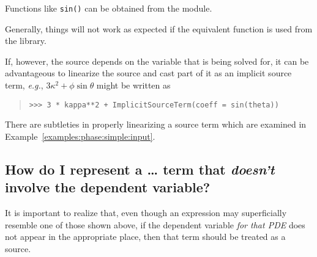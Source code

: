            \begin{reSTadmonition}[Note]
                Functions like \verb+sin()+ can be obtained from the
                 module.
                \begin{reSTadmonition}[Warning]
                    Generally, things will not work as expected if the
                    equivalent function is used from the \Numeric{}
                    library.
                \end{reSTadmonition}
            \end{reSTadmonition}
            
            If, however, the source depends on the variable that is being solved for,
            it can be advantageous to linearize the source and cast part of it as an
            implicit source term, \emph{e.g.}, $3\kappa^2 + \phi \sin \theta$
            might be written as
            \begin{quote}
\begin{verbatim}
>>> 3 * kappa**2 + ImplicitSourceTerm(coeff = sin(theta))
\end{verbatim}
            \end{quote}
            
            \begin{reSTadmonition}[Warning]
                There are subtleties in properly linearizing a source term
                which are examined in
                Example~\ref{examples:phase:simple:input}.
            \end{reSTadmonition}

            \subsection{How do I represent a \dots{} term that 
            \emph{doesn't} involve the dependent variable?}
            It is important to realize that, even though an expression may
            superficially resemble one of those shown above, if the
            dependent variable \emph{for that PDE} does not appear in the
            appropriate place, then that term should be treated as a source.

